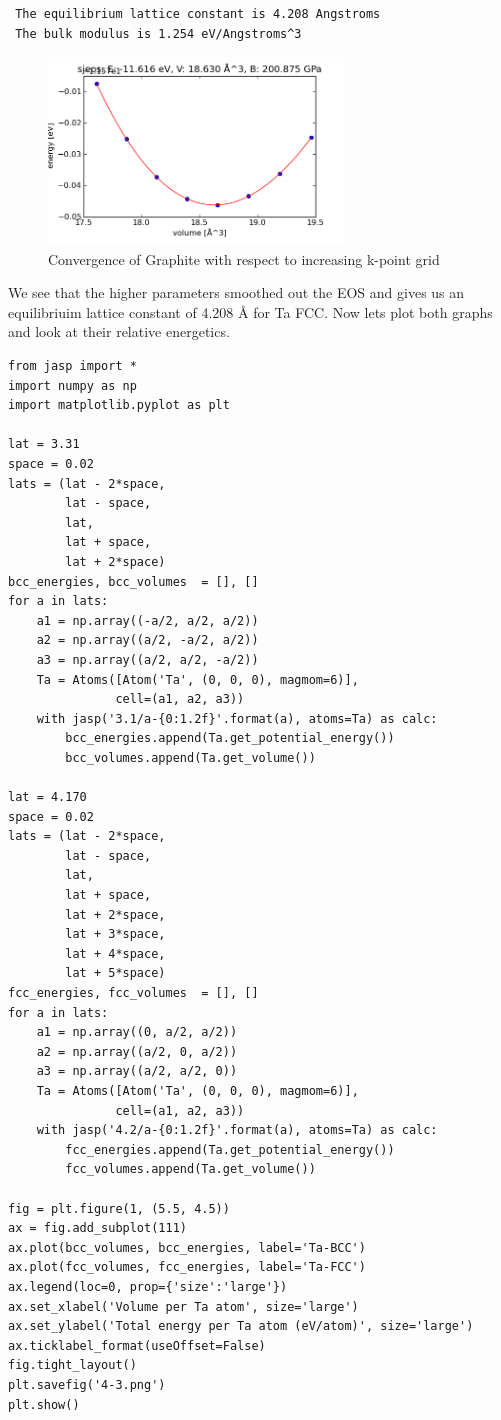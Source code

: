 \documentclass[11pt]{article}
\begin{document}
\begin{verbatim}
 The equilibrium lattice constant is 4.208 Angstroms
 The bulk modulus is 1.254 eV/Angstroms^3
\end{verbatim}

\begin{figure}[H]
\centering
\includegraphics[width=0.7\textwidth]{./4-2.png}
\caption{Convergence of Graphite with respect to increasing k-point grid}
\end{figure}

We see that the higher parameters smoothed out the EOS and gives us an equilibriuim lattice constant of 4.208 \AA{} for Ta FCC. Now lets plot both graphs and look at their relative energetics.


\begin{verbatim}
from jasp import *
import numpy as np
import matplotlib.pyplot as plt

lat = 3.31
space = 0.02
lats = (lat - 2*space,
        lat - space,
        lat,
        lat + space,
        lat + 2*space)
bcc_energies, bcc_volumes  = [], []
for a in lats:
    a1 = np.array((-a/2, a/2, a/2))
    a2 = np.array((a/2, -a/2, a/2))
    a3 = np.array((a/2, a/2, -a/2))
    Ta = Atoms([Atom('Ta', (0, 0, 0), magmom=6)],
               cell=(a1, a2, a3))
    with jasp('3.1/a-{0:1.2f}'.format(a), atoms=Ta) as calc:
        bcc_energies.append(Ta.get_potential_energy())
        bcc_volumes.append(Ta.get_volume())

lat = 4.170
space = 0.02
lats = (lat - 2*space,
        lat - space,
        lat,
        lat + space,
        lat + 2*space,
        lat + 3*space,
        lat + 4*space,
        lat + 5*space)
fcc_energies, fcc_volumes  = [], []
for a in lats:
    a1 = np.array((0, a/2, a/2))
    a2 = np.array((a/2, 0, a/2))
    a3 = np.array((a/2, a/2, 0))
    Ta = Atoms([Atom('Ta', (0, 0, 0), magmom=6)],
               cell=(a1, a2, a3))
    with jasp('4.2/a-{0:1.2f}'.format(a), atoms=Ta) as calc:
        fcc_energies.append(Ta.get_potential_energy())
        fcc_volumes.append(Ta.get_volume())

fig = plt.figure(1, (5.5, 4.5))
ax = fig.add_subplot(111)
ax.plot(bcc_volumes, bcc_energies, label='Ta-BCC')
ax.plot(fcc_volumes, fcc_energies, label='Ta-FCC')
ax.legend(loc=0, prop={'size':'large'})
ax.set_xlabel('Volume per Ta atom', size='large')
ax.set_ylabel('Total energy per Ta atom (eV/atom)', size='large')
ax.ticklabel_format(useOffset=False)
fig.tight_layout()
plt.savefig('4-3.png')
plt.show()
\end{verbatim}
\end{document}
